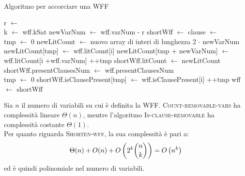 \begin{algorithm}[H]
    \caption{Algoritmo per accorciare una WFF}
    \label{alg:shorten_wff}
    \begin{algorithmic}[1]
            \State r $\gets$ 
                \State \Return
            \EndIf\\

            \State k $\gets$ wff.kSat
            \State newVarNum $\gets$ wff.varNum - r
            \State shortWff $\gets$ 
            \State clause $\gets$ \\

            \State tmp $\gets$ 0
            \State newLitCount $\gets$ nuovo array di interi di lunghezza 2 $\cdot$ newVarNum
                    \State newLitCount[tmp] $\gets$ wff.litCount[i]
                    \State newLitCount[tmp + newVarNum] $\gets$ wff.litCount[i +wff.varNum]
                    \State ++tmp
                \EndIf
            \EndFor
            \State shortWff.litCount $\gets$ newLitCount
            \State shortWff.presentClausesNum $\gets$ wff.presentClausesNum\\
            
            \State tmp $\gets$ 0
                    \State shortWff.isClausePresent[tmp] $\gets$ wff.isClausePresent[i]
                    \State ++tmp
                \EndIf
                \State {}
            \EndFor
            \State wff $\gets$ shortWff
        \EndProcedure
    \end{algorithmic}
\end{algorithm}
Sia $n$ il numero di variabili su cui è definita la WFF. 
\textsc{Count-removable-vars} ha complessità lineare $\Theta(n)$, mentre
l'algoritmo \textsc{Is-clause-removable} ha complessità costante $\Theta(1)$.\\
Per quanto riguarda \textsc{Shorten-wff}, la sua complessità è pari a:
\begin{equation*}
    \Theta(n) + O(n) + O \left(2^k \binom{n}{k}\right) = O \left(n^k\right)
\end{equation*}
ed è quindi polinomiale nel numero di variabili.